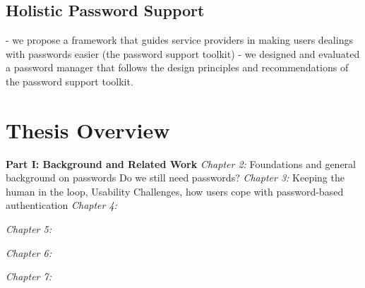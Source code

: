 \subsection{Holistic Password Support}
- we propose a framework that guides service providers in making users dealings with passwords easier (the password support toolkit)
- we designed and evaluated a password manager that follows the design principles and recommendations of the password support toolkit. 

\section{Thesis Overview}
\textbf{Part I: Background and Related Work}
\textit{Chapter 2:}
Foundations and general background on passwords
Do we still need passwords?
\textit{Chapter 3:}
Keeping the human in the loop, Usability Challenges, how users cope with password-based authentication
\textit{Chapter 4:}

\textit{Chapter 5:}

\textit{Chapter 6:}

\textit{Chapter 7:}




